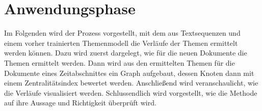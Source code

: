 \chapter{Anwendungsphase}
\label{chap:workflowTime}

Im Folgenden wird der Prozess vorgestellt, mit dem aus Textsequenzen und einem vorher trainierten Themenmodell die Verläufe der Themen ermittelt werden können. Dazu wird zuerst dargelegt, wie für die neuen Dokumente die Themen ermittelt werden. Dann wird aus den ermittelten Themen für die Dokumente eines Zeitabschnittes ein Graph aufgebaut, dessen Knoten dann mit einem Zentralitätsindex bewertet werden. Anschließend wird veranschaulicht, wie die Verläufe visualisiert werden. Schlussendlich wird vorgestellt, wie die Methode auf ihre Aussage und Richtigkeit überprüft wird.









